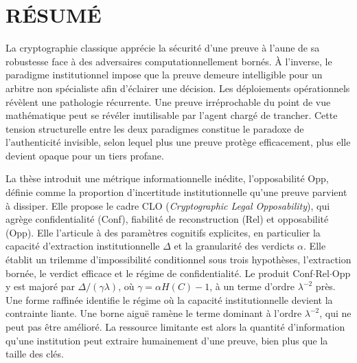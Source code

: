 
\chapter*{R\'ESUM\'E}
\thispagestyle{preliminaire}
\begin{sloppypar}
La cryptographie classique appr\'ecie la s\'ecurit\'e d'une preuve \`a
l'aune de sa robustesse face \`a des adversaires computationnellement
born\'es. \`A l'inverse, le paradigme institutionnel impose que la preuve
demeure intelligible pour un arbitre non sp\'ecialiste afin d'\'eclairer
une d\'ecision. Les d\'eploiements op\'erationnels r\'ev\`elent une
pathologie r\'ecurrente. Une preuve irr\'eprochable du point de vue
math\'ematique peut se r\'ev\'eler inutilisable par l'agent charg\'e de
trancher. Cette tension structurelle entre les deux paradigmes constitue
le paradoxe de l'authenticit\'e invisible, selon lequel plus une preuve
prot\`ege efficacement, plus elle devient opaque pour un tiers profane.

La th\`ese introduit une m\'etrique informationnelle in\'edite,
l'opposabilit\'e Opp, d\'efinie comme la proportion d'incertitude
institutionnelle qu'une preuve parvient \`a dissiper. Elle propose le
cadre CLO (\emph{Cryptographic Legal Opposability}), qui agr\`ege confidentialit\'e (Conf), fiabilit\'e de reconstruction (Rel) et
opposabilit\'e (Opp). Elle l'articule \`a des param\`etres cognitifs
explicites, en particulier la capacit\'e d'extraction institutionnelle
$\Delta$ et la granularit\'e des verdicts $\alpha$. Elle \'etablit un
trilemme d'impossibilit\'e conditionnel sous trois hypoth\`eses, l'extraction
born\'ee, le verdict efficace et le r\'egime de confidentialit\'e. Le produit
Conf$\cdot$Rel$\cdot$Opp y est major\'e par $\Delta/(\gamma\lambda)$, o\`u
$\gamma = \alpha H(C) - 1$, \`a un terme d'ordre $\lambda^{-2}$ pr\`es. Une forme raffin\'ee identifie le r\'egime o\`u la capacit\'e
institutionnelle devient la contrainte liante. Une borne aigu\"e ram\`ene le
terme dominant \`a l'ordre $\lambda^{-2}$, qui ne peut pas \^etre am\'elior\'e. La ressource limitante
est alors la quantit\'e d'information qu'une institution peut
extraire humainement d'une preuve, bien plus que la taille des cl\'es.


\end{sloppypar}
